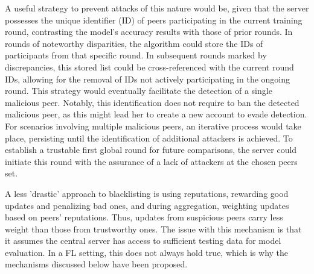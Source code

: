 A useful strategy to prevent attacks of this nature would be, given that the server possesses the unique identifier (ID) of peers participating in the current training round, contrasting the model's accuracy results with those of prior rounds. In rounds of noteworthy disparities, the algorithm could store the IDs of participants from that specific round. In subsequent rounds marked by discrepancies, this stored list could be cross-referenced with the current round IDs, allowing for the removal of IDs not actively participating in the ongoing round. This strategy would eventually facilitate the detection of a single malicious peer. Notably, this identification does not require to ban the detected malicious peer, as this might lead her to create a new account to evade detection.
For scenarios involving multiple malicious peers, an iterative process would take place, persisting until the identification of additional attackers is achieved. To establish a trustable first global round for future comparisons, the server could initiate this round with the assurance of a lack of attackers at the chosen peers set.


A less 'drastic' approach to blacklisting is using reputations, rewarding good updates and penalizing bad ones, and during aggregation, weighting updates based on peers' reputations. Thus, updates from suspicious peers carry less weight than those from trustworthy ones.
The issue with this mechanism is that it assumes the central server has access to sufficient testing data for model evaluation. In a FL setting, this does not always hold true, which is why the mechanisms discussed below have been proposed.



